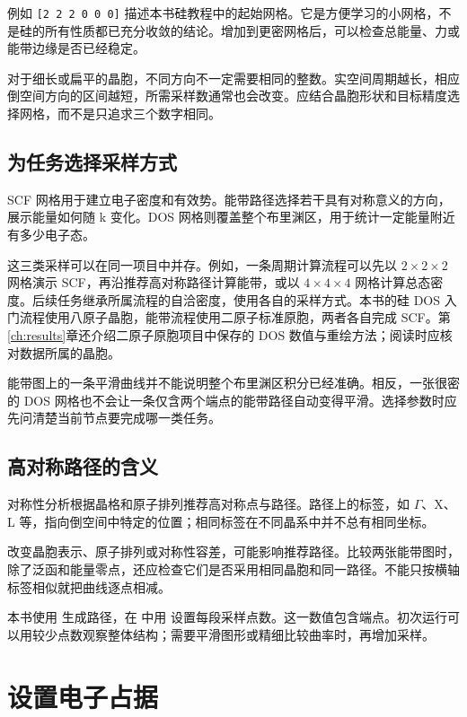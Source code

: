 例如 \mbox{\texttt{[2 2 2 0 0 0]}} 描述本书硅教程中的起始网格。它是方便学习的小网格，不是硅的所有性质都已充分收敛的结论。增加到更密网格后，可以检查总能量、力或能带边缘是否已经稳定。

对于细长或扁平的晶胞，不同方向不一定需要相同的整数。实空间周期越长，相应倒空间方向的区间越短，所需采样数通常也会改变。应结合晶胞形状和目标精度选择网格，而不是只追求三个数字相同。

\subsection{为任务选择采样方式}

SCF 网格用于建立电子密度和有效势。能带路径选择若干具有对称意义的方向，展示能量如何随 k 变化。DOS 网格则覆盖整个布里渊区，用于统计一定能量附近有多少电子态。



这三类采样可以在同一项目中并存。例如，一条周期计算流程可以先以 $2\times2\times2$ 网格演示 SCF，再沿推荐高对称路径计算能带，或以 $4\times4\times4$ 网格计算总态密度。后续任务继承所属流程的自洽密度，使用各自的采样方式。本书的硅 DOS 入门流程使用八原子晶胞，能带流程使用二原子标准原胞，两者各自完成 SCF。第\ref{ch:results}章还介绍二原子原胞项目中保存的 DOS 数值与重绘方法；阅读时应核对数据所属的晶胞。

能带图上的一条平滑曲线并不能说明整个布里渊区积分已经准确。相反，一张很密的 DOS 网格也不会让一条仅含两个端点的能带路径自动变得平滑。选择参数时应先问清楚当前节点要完成哪一类任务。

\subsection{高对称路径的含义}

对称性分析根据晶格和原子排列推荐高对称点与路径。路径上的标签，如 $\Gamma$、X、L 等，指向倒空间中特定的位置；相同标签在不同晶系中并不总有相同坐标。

改变晶胞表示、原子排列或对称性容差，可能影响推荐路径。比较两张能带图时，除了泛函和能量零点，还应检查它们是否采用相同晶胞和同一路径。不能只按横轴标签相似就把曲线逐点相减。

本书使用  生成路径，在  中用 \mbox{} 设置每段采样点数。这一数值包含端点。初次运行可以用较少点数观察整体结构；需要平滑图形或精细比较曲率时，再增加采样。

\section{设置电子占据}

